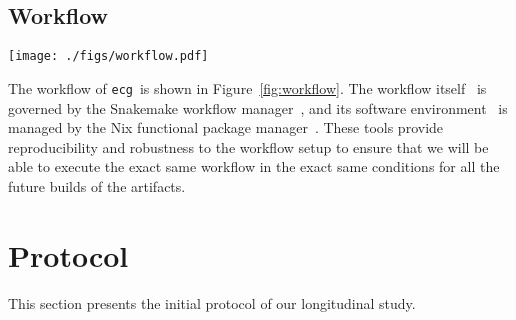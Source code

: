 \documentclass[sigconf,natbib=false]{acmart}
\newcommand{\df}{\texttt{Dockerfile}}
\newcommand{\ecg}{\texttt{ecg}}
\newcommand{\todo}[1]{{\color{red}{TODO: #1}}}
\begin{document}
\subsection{Workflow}\label{sec:workflow}

\begin{figure*}
  \centering
  \texttt{[image: ./figs/workflow.pdf]}
  \caption{
    Workflow of \ecg.
    Each description of an artifact is verified with the Nickel contract and then converted in a JSON representation.
    This JSON representation is then read by \ecg\ to
    download the artifact,
    compute the hash of its content,
    build the container from the \df, and
    extract the software environment information from the built container.
    \ecg\ outputs files containing the information about the artifact and its \df\ .
  }
  \label{fig:workflow}
\end{figure*}

The workflow of \ecg\ is shown in Figure~\ref{fig:workflow}.
The workflow itself~\cite{ecg_workflow} is governed by the Snakemake workflow manager~\cite{koster2012snakemake}, and its software environment~\cite{ecg_nix} is managed by the Nix functional package manager~\cite{dolstra_nix_2004}.
These tools provide reproducibility and robustness to the workflow setup to ensure that we will be able to execute the exact same workflow in the exact same conditions for all the future builds of the artifacts.

% 

\section{Protocol}\label{sec:protocol}

This section presents the initial protocol of our longitudinal study.
\end{document}
